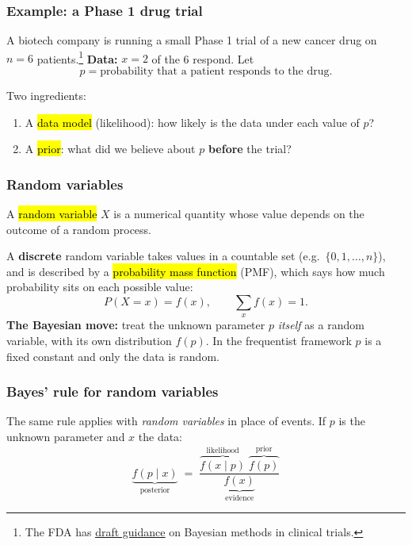 \documentclass[slidestop,compress,mathserif]{beamer}
\begin{document}
\begin{frame}
\frametitle{Example: a Phase 1 drug trial}

A biotech company is running a small Phase 1 trial of a new cancer drug on $n = 6$ patients.\footnote{\scriptsize The FDA has \underline{\href{https://www.fda.gov/regulatory-information/search-fda-guidance-documents/use-bayesian-methodology-clinical-trials-drug-and-biological-products}{draft guidance}} on Bayesian methods in clinical trials.} \textbf{Data:} $x = 2$ of the 6 respond. Let
\[
p = \text{probability that a patient responds to the drug.}
\]
\pause
{}

\pause
Two ingredients:
\begin{enumerate}
\item A \hl{data model} (likelihood): how likely is the data under each value of $p$?
\item A \hl{prior}: what did we believe about $p$ \textbf{before} the trial?
\end{enumerate}

\end{frame}

\begin{frame}
\frametitle{Random variables}

A \hl{random variable} $X$ is a numerical quantity whose value depends on the outcome of a random process.

\pause
\medskip

A \textbf{discrete} random variable takes values in a countable set (e.g.\ $\{0, 1, \dots, n\}$), and is described by a \hl{probability mass function} (PMF), which says how much probability sits on each possible value:
\[
P(X = x) = f(x), \qquad \sum_x f(x) = 1.
\]
\pause
\textbf{The Bayesian move:} treat the unknown parameter $p$ \emph{itself} as a random variable, with its own distribution $f(p)$. In the frequentist framework $p$ is a fixed constant and only the data is random.

\end{frame}

\begin{frame}
\frametitle{Bayes' rule for random variables}

The same rule applies with \emph{random variables} in place of events. If $p$ is the unknown parameter and $x$ the data:
\[
\underbrace{f(p \mid x)}_{\text{posterior}} \;=\; \frac{\overbrace{f(x \mid p)}^{\text{likelihood}}\;\overbrace{f(p)}^{\text{prior}}}{\underbrace{f(x)}_{\text{evidence}}}
\]
\pause


\end{frame}
\end{document}

